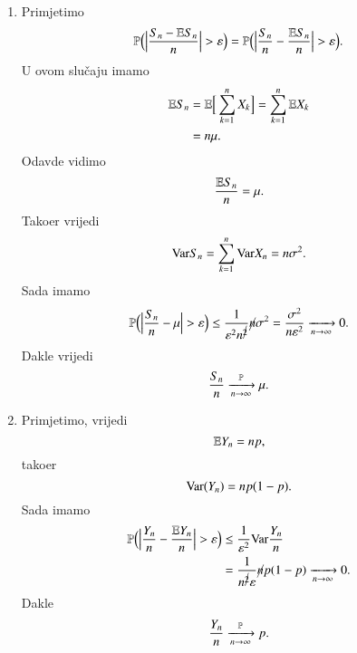 \begin{rj}[\ref{zad:12.6}]
\begin{enumerate}[label=(\alph*)]
        \item Primjetimo
        \begin{equation*}
            \mathbb{P} \Big( \Big| \frac{S_n - \mathbb{E} S_n}{n} \Big| > \varepsilon \Big) = \mathbb{P} \Big( \Big| \frac{S_n}{n} - \frac{\mathbb{E} S_n}{n} \Big| > \varepsilon \Big).
        \end{equation*}
        U ovom slu\v caju imamo
        \begin{equation*}
            \begin{aligned}
                \mathbb{E} S_n &= \mathbb{E} \Big[ \sum\limits_{k = 1}^{n} X_k \Big] = \sum\limits_{k = 1}^{n} \mathbb{E} X_k\\
                &= n \mu.
            \end{aligned}
        \end{equation*}
        Odavde vidimo
        \begin{equation*}
            \frac{\mathbb{E} S_n}{n} = \mu.
        \end{equation*}
        Tako\dj er vrijedi
        \begin{equation*}
            \mathrm{Var} S_n = \sum\limits_{k = 1}^{n} \mathrm{Var} X_n = n \sigma^2.
        \end{equation*}
        Sada imamo
        \begin{equation*}
            \mathbb{P} \Big( \Big| \frac{S_n}{n} - \mu \Big| > \varepsilon \Big) \leq \frac{1}{\varepsilon^2 n^{\cancel{2}}} \cancel{n} \sigma^2 = \frac{\sigma^2}{n \varepsilon^2} \xrightarrow[n \to \infty]{} 0.
        \end{equation*}
        Dakle vrijedi
        \begin{equation*}
            \frac{S_n}{n} \xrightarrow[n \to \infty]{\mathbb{P}} \mu .
        \end{equation*}

        \item Primjetimo, vrijedi
        \begin{equation*}
            \mathbb{E} Y_n = n p,
        \end{equation*}
        tako\dj er
        \begin{equation*}
            \mathrm{Var} (Y_n) = n p (1 - p).
        \end{equation*}
        Sada imamo
        \begin{equation*}
            \begin{aligned}
                \mathbb{P} \Big( \Big| \frac{Y_n}{n} - \frac{\mathbb{E} Y_n}{n} \Big| > \varepsilon \Big) &\leq \frac{1}{\varepsilon^2} \mathrm{Var} \frac{Y_n}{n}\\
                &= \frac{1}{n^{\cancel{2}} \varepsilon} \cancel{n} p (1 - p) \xrightarrow[n \to \infty]{} 0.  
            \end{aligned}
        \end{equation*}
        Dakle
        \begin{equation*}
            \frac{Y_n}{n} \xrightarrow[n \to \infty]{\mathbb{P}} p.
        \end{equation*}
    \end{enumerate}
\end{rj}

